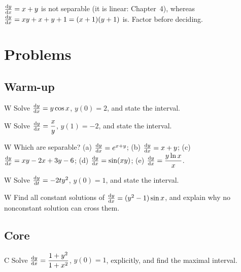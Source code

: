 \begin{pitfall}\label{pit:ch03-not-separable}
$\frac{\mathrm{d}y}{\mathrm{d}x} = x + y$ is not separable (it is linear: Chapter~4), whereas
$\frac{\mathrm{d}y}{\mathrm{d}x} = xy + x + y + 1 = (x+1)(y+1)$ is. Factor before deciding.
\end{pitfall}

\section{Problems}\label{sec:ch03-problems}

\subsection*{Warm-up}

\begin{problem}{W}\label{prob:ch03-w1}
Solve $\frac{\mathrm{d}y}{\mathrm{d}x} = y\cos x$, $y(0) = 2$, and state the interval.
\end{problem}

\begin{problem}{W}\label{prob:ch03-w2}
Solve $\frac{\mathrm{d}y}{\mathrm{d}x} = \dfrac{x}{y}$, $y(1) = -2$, and state the interval.
\end{problem}

\begin{problem}{W}\label{prob:ch03-w3}
Which are separable? (a) $\frac{\mathrm{d}y}{\mathrm{d}x} = e^{x+y}$; (b) $\frac{\mathrm{d}y}{\mathrm{d}x} = x + y$;
(c) $\frac{\mathrm{d}y}{\mathrm{d}x} = xy - 2x + 3y - 6$; (d) $\frac{\mathrm{d}y}{\mathrm{d}x} = \sin(xy)$;
(e) $\frac{\mathrm{d}y}{\mathrm{d}x} = \dfrac{y\ln x}{x}$.
\end{problem}

\begin{problem}{W}\label{prob:ch03-w4}
Solve $\frac{\mathrm{d}y}{\mathrm{d}t} = -2ty^2$, $y(0) = 1$, and state the interval.
\end{problem}

\begin{problem}{W}\label{prob:ch03-w5}
Find all constant solutions of $\frac{\mathrm{d}y}{\mathrm{d}x} = (y^2 - 1)\sin x$, and explain why
no nonconstant solution can cross them.
\end{problem}

\subsection*{Core}

\begin{problem}{C}\label{prob:ch03-c1}
Solve $\frac{\mathrm{d}y}{\mathrm{d}x} = \dfrac{1 + y^2}{1 + x^2}$, $y(0) = 1$, explicitly, and find
the maximal interval.
\end{problem}

